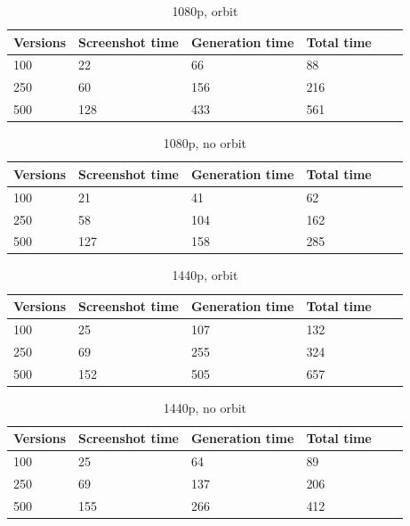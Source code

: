 \documentclass[]{usiinfbachelorproject}
\begin{document}
\begin{table}[H]
    \begin{center}
        \begin{tabular}{ | l | l | l | l | l | l |}
        \hline
        Versions & Screenshot time & Generation time & Total time \\ \hline
        100 & 22 & 66 & 88 \\ \hline
        250 & 60 & 156 & 216\\ \hline
        500 & 128 & 433 & 561\\ \hline
        \end{tabular}
    \end{center}
    \caption{1080p, orbit}
    \label{tab:performance}
\end{table}

\begin{table}[H]
    \begin{center}
        \begin{tabular}{ | l | l | l | l | l | l |}
        \hline
        Versions & Screenshot time & Generation time & Total time \\ \hline
        100 & 21 & 41 & 62 \\ \hline
        250 & 58 & 104 & 162\\ \hline
        500 & 127 & 158 & 285\\ \hline
        \end{tabular}
    \end{center}
    \caption{1080p, no orbit}
    \label{tab:performance}
\end{table}

\begin{table}[H]
    \begin{center}
        \begin{tabular}{ | l | l | l | l | l | l |}
        \hline
        Versions & Screenshot time & Generation time & Total time \\ \hline
        100 & 25 & 107 & 132 \\ \hline
        250 & 69 & 255 & 324\\ \hline
        500 & 152 & 505 & 657\\ \hline
        \end{tabular}
    \end{center}
    \caption{1440p, orbit}
    \label{tab:performance}
\end{table}

\begin{table}[H]
    \begin{center}
        \begin{tabular}{ | l | l | l | l | l | l |}
        \hline
        Versions & Screenshot time & Generation time & Total time \\ \hline
        100 & 25 & 64 & 89 \\ \hline
        250 & 69 & 137 & 206\\ \hline
        500 & 155 & 266 & 412\\ \hline
        \end{tabular}
    \end{center}
    \caption{1440p, no orbit}
    \label{tab:performance}
\end{table}
\end{document}
